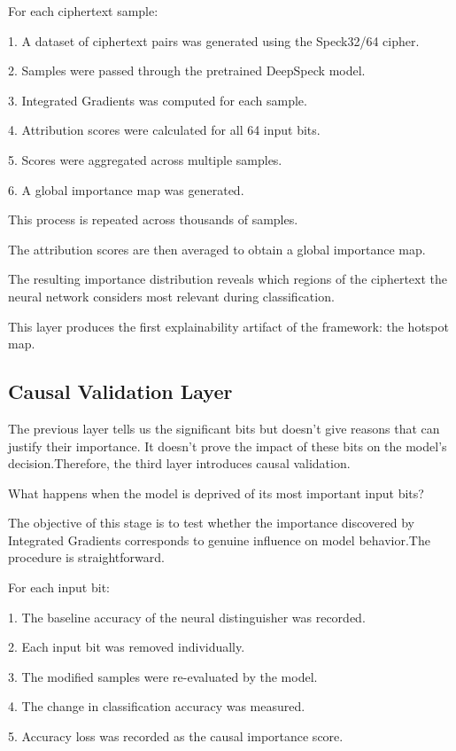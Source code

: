 For each ciphertext sample: 

1.  A dataset of ciphertext pairs was generated using the Speck32/64 cipher. 


2.  Samples were passed through the pretrained DeepSpeck model. 

3.  Integrated Gradients was computed for each sample. 

4.  Attribution scores were calculated for all 64 input bits. 

5.  Scores were aggregated across multiple samples. 

6.  A global importance map was generated. 

This process is repeated across thousands of samples. 

The attribution scores are then averaged to obtain a global importance map. 

The resulting importance distribution reveals which regions of the ciphertext the neural network 
considers most relevant during classification. 

This layer produces the first explainability artifact of the framework: the hotspot map. 

\subsection{Causal Validation Layer}

The previous layer tells us the significant bits but doesn't give reasons that can justify their 
importance. It doesn’t prove the impact of these bits on the model’s decision.Therefore, the third 
layer introduces causal validation. 

What happens when the model is deprived of its most important input bits? 

The objective of this stage is to test whether the importance discovered by Integrated Gradients 
corresponds to genuine influence on model behavior.The procedure is straightforward. 

For each input bit: 

1.  The baseline accuracy of the neural distinguisher was recorded. 

2.  Each input bit was removed individually. 

3.  The modified samples were re-evaluated by the model. 

4.  The change in classification accuracy was measured. 

5.  Accuracy loss was recorded as the causal importance score. 



